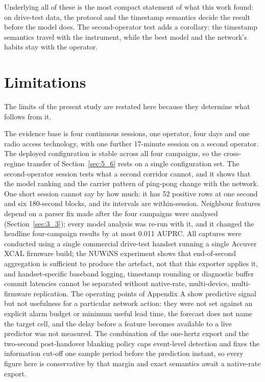 Underlying all of these is the most compact statement of what this work found: on drive-test data, the protocol and the timestamp semantics decide the result before the model does. The second-operator test adds a corollary: the timestamp semantics travel with the instrument, while the best model and the network's habits stay with the operator.


\section{Limitations}
\label{sec:7_2}

The limits of the present study are restated here because they determine what follows from it.

The evidence base is four continuous sessions, one operator, four days and one radio access technology, with one further 17-minute session on a second operator. The deployed configuration is stable across all four campaigns, so the cross-regime transfer of Section~\ref{sec:5_6} rests on a single configuration set. The second-operator session tests what a second corridor cannot, and it shows that the model ranking and the carrier pattern of ping-pong change with the network. One short session cannot say by how much: it has 52 positive rows at one second and six 180-second blocks, and its intervals are within-session. Neighbour features depend on a parser fix made after the four campaigns were analysed (Section~\ref{sec:3_3}); every model analysis was re-run with it, and it changed the headline four-campaign results by at most 0.011 AUPRC. All captures were conducted using a single commercial drive-test handset running a single Accuver XCAL firmware build; the NUWiNS experiment shows that end-of-second aggregation is sufficient to produce the artefact, not that this exporter applies it, and handset-specific baseband logging, timestamp rounding or diagnostic buffer commit latencies cannot be separated without native-rate, multi-device, multi-firmware replication. The operating points of Appendix A show predictive signal but not usefulness for a particular network action: they were not set against an explicit alarm budget or minimum useful lead time, the forecast does not name the target cell, and the delay before a feature becomes available to a live predictor was not measured. The combination of the one-hertz export and the two-second post-handover blanking policy caps event-level detection and fixes the information cut-off one sample period before the prediction instant, so every figure here is conservative by that margin and exact semantics await a native-rate export.

